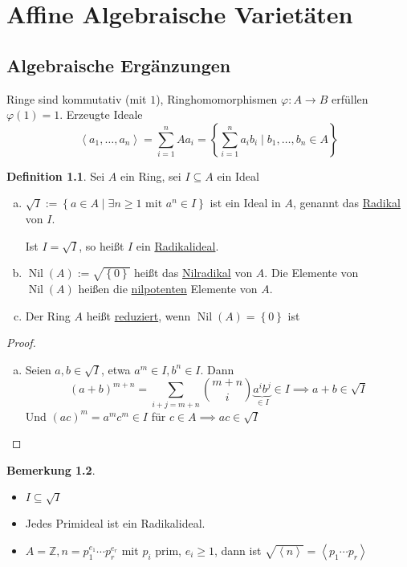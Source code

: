 \documentclass[
twoside=semi,
fontsize=12,
DIV=12, 
cleardoublepage=current,
leqno,
headings=optiontoheadandtoc, 
toc=idx
]{scrbook}
\newcommand{\Z}{\mathbb{Z}}
\newcommand{\bracC}[1]{\left< #1 \right>}
\newcommand{\set}[1]{\left\{ #1 \right\}}
\newcommand{\emphasize}[1]{\underline{#1}}
\DeclareMathOperator{\Nil}{Nil}
\theoremstyle{definition}
\newtheorem{definition}{Definition}[section]
\newtheorem{bemerkung}[definition]{Bemerkung}
\begin{document}
	\tableofcontents\thispagestyle{empty}
	\newpage\thispagestyle{empty}
	\mainmatter
	\chapter{Affine Algebraische Variet\"aten}
	\pagestyle{main}
	
	\section{Algebraische Erg\"anzungen}
	Ringe sind kommutativ (mit $1$), Ringhomomorphismen $\varphi: A\to B$ erf\"ullen $\varphi(1) = 1$. Erzeugte Ideale 
		\[\bracC{a_1, \dots, a_n} = \sum_{i=1}^{n} Aa_i = \set{\sum_{i=1}^{n} a_ib_i \mid b_1, \dots, b_n \in A}\]
	
	\begin{definition}\label{1.1.1}\hfill\newline
		Sei $A$ ein Ring, sei $I \subseteq A$ ein Ideal
		\begin{enumerate}[(a)]
			\item $\sqrt{I} := \set{a\in A \mid \exists n \geq 1 \textrm{ mit } a^n \in I}$ ist ein Ideal in $A$, genannt das \emphasize{Radikal} von $I$.
			
			\medskip\noindent
			Ist $I = \sqrt{I}$, so hei\ss t $I$ ein \emphasize{Radikalideal}.
			
			\item $\Nil(A) := \sqrt{\set{0}}$ hei\ss t das \emphasize{Nilradikal} von $A$. Die Elemente von $\Nil(A)$ hei\ss en die \emphasize{nilpotenten} Elemente von $A$.
			
			\item Der Ring $A$ hei\ss t \emphasize{reduziert}, wenn $\Nil(A) = \set{0}$ ist
		\end{enumerate}
	\end{definition}
	
	\begin{proof}
		\begin{enumerate}[(a)]
			\item Seien $a, b \in \sqrt{I}$, etwa $a^m \in I, b^n \in I$. Dann
				\[(a+b)^{m+n} = \sum_{i+j=m+n} \binom{m+n}{i} \underbrace{a^ib^j}_{\in I} \in I  \implies a+b \in \sqrt{I}\]
			Und $(ac)^m = a^mc^m \in I$ f\"ur $c \in A \implies ac \in \sqrt{I}$
 		\end{enumerate}
	\end{proof}

	\begin{bemerkung}\label{1.1.2}\hfill
		\begin{itemize}
			\item $I \subseteq \sqrt{I}$
			\item Jedes Primideal ist ein Radikalideal.
			\item $A= \Z, n = p_1^{e_1} \cdots p_r^{e_r}$ mit $p_i$ prim, $e_i \geq 1$, dann ist 
			$\sqrt{\bracC{n}} = \bracC{p_1 \cdots p_r}$
		\end{itemize}
	\end{bemerkung}
\end{document}
